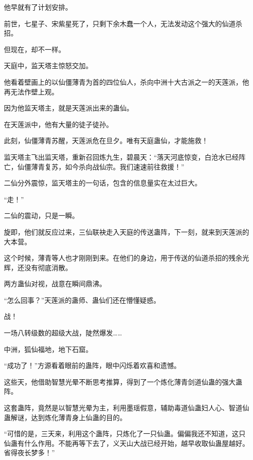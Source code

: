 \begin{this_body}
他早就有了计划安排。

前世，七星子、宋紫星死了，只剩下余木蠢一个人，无法发动这个强大的仙道杀招。

但现在，却不一样。

天庭中，监天塔主惊怒交加。

他看着壁画上的以仙僵薄青为首的四位仙人，杀向中洲十大古派之一的天莲派，他再无法作壁上观。

因为他监天塔主，就是天莲派出来的蛊仙。

在天莲派中，他有大量的徒子徒孙。

此刻，仙僵薄青苏醒，天莲派危在旦夕。唯有天庭蛊仙，才能施救！

监天塔主飞出监天塔，重新召回炼九生，碧晨天：“落天河底惊变，白沧水已经阵亡，仙僵薄青复苏，如今杀向战仙宗。我们速速前往救援！”

二仙分外震惊，监天塔主的一句话，包含的信息量实在太过巨大。

“走！”

二仙的震动，只是一瞬。

旋即，他们就反应过来，三仙联袂走入天庭的传送蛊阵，下一刻，就来到天莲派的大本营。

这个时候，薄青等人也才刚刚到来。在他们的身边，用于传送的仙道杀招的残余光辉，还没有彻底消散。

两方蛊仙对视，战意在瞬间鼎沸。

“怎么回事？”天莲派的蛊师、蛊仙们还在懵懂疑惑。

战！

一场八转级数的超级大战，陡然爆发……

中洲，狐仙福地，地下石窟。

“成功了！”方源看着眼前的蛊阵，眼中闪烁着欢喜和遗憾。

这些天，他借助智慧光晕不断思考推算，得到了一个炼化薄青剑道仙蛊的强大蛊阵。

这套蛊阵，竟然是以智慧光晕为主，利用墨瑶假意，辅助毒道仙蛊妇人心、智道仙蛊解谜，达到炼化薄青身上仙蛊的目的。

“可惜的是，三天来，利用这个蛊阵，只炼化了一只仙蛊。偏偏我还不知道，这只仙蛊有什么作用。不能再等下去了，义天山大战已经开始，越早收取仙蛊屋越好。省得夜长梦多！”

\end{this_body}

